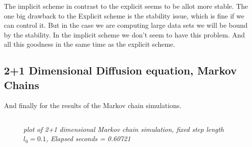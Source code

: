 \documentclass[english,a4paper,12pt]{article}
\begin{document}
The implicit scheme in contrast to the explicit seems to be allot more stable. The one big drawback to the Explicit scheme is the
stability issue, which is fine if we can control it. But in the case we are computing large data sets we will be bound by the stability.
In the implicit scheme we don't seem to have this problem. And all this goodness in the same time as the explicit scheme. 


\subsection*{2+1 Dimensional Diffusion equation,  Markov Chains}

And finally for the results of the Markov chain simulations.  

\subsection*{}
\begin{figure}[H]
 \begin{center}
 \end{center}
 \caption{\textit{plot of 2+1 dimensional Markov chain simulation, fixed step length $l_0 = 0.1$, Elapsed seconds =  0.60721}}
 \label{fig:edge}
\end{figure}
\end{document}
